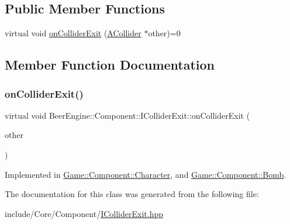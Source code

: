 \subsection*{Public Member Functions}
\begin{DoxyCompactItemize}
\item 
virtual void \mbox{\hyperlink{class_beer_engine_1_1_component_1_1_i_collider_exit_a3669477d0003535fbe0411449efc69e9}{on\+Collider\+Exit}} (\mbox{\hyperlink{class_beer_engine_1_1_component_1_1_a_collider}{A\+Collider}} $\ast$other)=0
\end{DoxyCompactItemize}


\subsection{Member Function Documentation}
\mbox{\label{class_beer_engine_1_1_component_1_1_i_collider_exit_a3669477d0003535fbe0411449efc69e9}} 
\subsubsection{\texorpdfstring{on\+Collider\+Exit()}{onColliderExit()}}
{\footnotesize\ttfamily virtual void Beer\+Engine\+::\+Component\+::\+I\+Collider\+Exit\+::on\+Collider\+Exit (\begin{DoxyParamCaption}\item[{\mbox{\hyperlink{class_beer_engine_1_1_component_1_1_a_collider}{A\+Collider}} $\ast$}]{other }\end{DoxyParamCaption})\hspace{0.3cm}{\ttfamily [pure virtual]}}



Implemented in \mbox{\hyperlink{class_game_1_1_component_1_1_character_afe4232175cd33c92027adacba5217b16}{Game\+::\+Component\+::\+Character}}, and \mbox{\hyperlink{class_game_1_1_component_1_1_bomb_a73e1089e8b6be42c0357beda3ab6ccfa}{Game\+::\+Component\+::\+Bomb}}.



The documentation for this class was generated from the following file\+:\begin{DoxyCompactItemize}
\item 
include/\+Core/\+Component/\mbox{\hyperlink{_i_collider_exit_8hpp}{I\+Collider\+Exit.\+hpp}}\end{DoxyCompactItemize}
